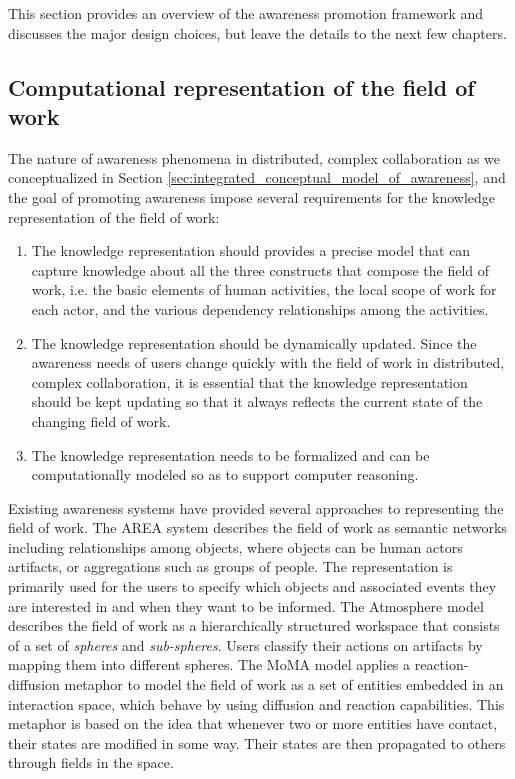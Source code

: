 This section provides an overview of the awareness promotion framework and discusses the major design choices, but leave the details to the next few chapters.

\subsection{Computational representation of the field of work} %
\label{sub:computational_representation_of_the_field_of_work}
The nature of awareness phenomena in distributed, complex collaboration as we conceptualized in Section \ref{sec:integrated_conceptual_model_of_awareness}, and the goal of promoting awareness impose several requirements for the knowledge representation of the field of work:

\begin{enumerate}
   \item The knowledge representation should provides a precise model that can capture knowledge about all the three constructs that compose the field of work, i.e. the basic elements of human activities, the local scope of work for each actor, and the various dependency relationships among the activities. 
   \item The knowledge representation should be dynamically updated. Since the awareness needs of users change quickly with the field of work in distributed, complex collaboration, it is essential that the knowledge representation should be kept updating so that it always reflects the current state of the changing field of work.
   \item The knowledge representation needs to be formalized and can be computationally modeled so as to support computer reasoning.
\end{enumerate}

Existing awareness systems have provided several approaches to representing the field of work. The AREA system \cite{fuchs1999a} describes the field of work as semantic networks including relationships among objects, where objects can be human actors artifacts, or aggregations such as groups of people. The representation is primarily used for the users to specify which objects and associated events they are interested in and when they want to be informed. The Atmosphere model \cite{Rittenbruch2002} describes the field of work as a hierarchically structured workspace that consists of a set of \emph{spheres} and \emph{sub-spheres}. Users classify their actions on artifacts by mapping them into different spheres. The MoMA model \cite{simone2002a} applies a reaction-diffusion metaphor to model the field of work as a set of entities embedded in an interaction space, which behave by using diffusion and reaction capabilities. This metaphor is based on the idea that whenever two or more entities have contact, their states are modified in some way. Their states are then propagated to others through fields in the space.  

